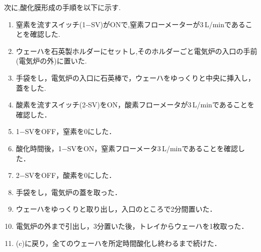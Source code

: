 \documentclass[11pt]{jarticle}
\begin{document}
\begin{enumerate}
				次に,酸化膜形成の手順を以下に示す.
				\begin{enumerate}
					\item 窒素を流すスイッチ(1−SV)がONで,窒素フローメーターが3\,L/minであることを確認した.
					\item ウェーハを石英製ホルダーにセットし,そのホルダーごと電気炉の入口の手前(電気炉の外)に置いた.
					\item 手袋をし，電気炉の入口に石英棒で，ウェーハをゆっくりと中央に挿入し，蓋をした.
					\item 酸素を流すスイッチ(2‐SV)をON，酸素フローメータが3\,L/minであることを確認した．
					\item 1−SVをOFF，窒素を0にした．
					\item 酸化時間後，1−SVをON，窒素フローメータ3\,L/minであることを確認した．
					\item 2−SVをOFF，酸素を0にした．
					\item 手袋をし，電気炉の蓋を取った．
					\item ウェーハをゆっくりと取り出し，入口のところで2分間置いた．
					\item 電気炉の外まで引出し，3分置いた後，トレイからウェーハを1枚取った．
					\item (c)に戻り，全てのウェーハを所定時間酸化し終わるまで続けた．
				\end{enumerate}


\end{enumerate}
\end{document}
